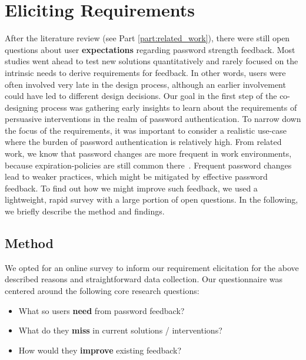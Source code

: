 \section{Eliciting Requirements}\label{sec:codesign:part1}
After the literature review (see Part \ref{part:related_work}), there were still open questions about user \textbf{expectations} regarding password strength feedback. Most studies went ahead to test new solutions quantitatively and rarely focused on the intrinsic needs to derive requirements for feedback. In other words, users were often involved very late in the design process, although an earlier involvement could have led to different design decisions. Our goal in the first step of the co-designing process was gathering early insights to learn about the requirements of persuasive interventions in the realm of password authentication. 
%
To narrow down the focus of the requirements, it was important to consider a realistic use-case where the burden of password authentication is relatively high. From related work, we know that password changes are more frequent in work environments, because expiration-policies are still common there \cite{Inglesant2010TrueCostOfUnusablePolicies}. Frequent password changes lead to weaker practices, which might be mitigated by effective password feedback. To find out how we might improve such feedback, we used a lightweight, rapid survey with a large portion of open questions. In the following, we briefly describe the method and findings. 
 

\subsection{Method}
We opted for an online survey to inform our requirement elicitation for the above described reasons and straightforward data collection. Our questionnaire was centered around the following core research questions:
\begin{itemize}
	\item What so users \textbf{need} from password feedback?
	\item What do they \textbf{miss} in current solutions / interventions?
	\item How would they \textbf{improve} existing feedback?
\end{itemize}

